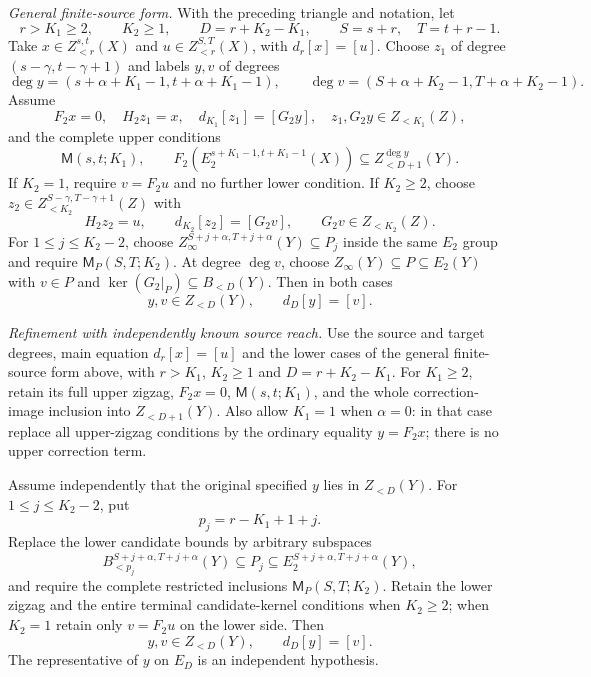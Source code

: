 \begin{corollary}
\textit{General finite-source form.}
With the preceding triangle and notation, let
\[
r>K_1\ge2,\qquad K_2\ge1,\qquad D=r+K_2-K_1,
\qquad S=s+r,\quad T=t+r-1.
\]
Take $x\in Z_{<r}^{s,t}(X)$ and $u\in Z_{<r}^{S,T}(X)$,
with $d_r[x]=[u]$. Choose $z_1$ of degree
$(s-\gamma,t-\gamma+1)$ and labels $y,v$ of degrees
\[
\deg y=(s+\alpha+K_1-1,t+\alpha+K_1-1),\qquad
\deg v=(S+\alpha+K_2-1,T+\alpha+K_2-1).
\]
Assume
\[
F_2x=0,\quad H_2z_1=x,\quad d_{K_1}[z_1]=[G_2y],
\quad z_1,G_2y\in Z_{<K_1}(Z),
\]
and the complete upper conditions
\[
\mathsf M(s,t;K_1),\qquad
F_2\!\left(E_2^{s+K_1-1,t+K_1-1}(X)\right)
 \subseteq Z_{<D+1}^{\deg y}(Y).
\]
If $K_2=1$, require $v=F_2u$ and no further lower condition.
If $K_2\ge2$, choose $z_2\in Z_{<K_2}^{S-\gamma,T-\gamma+1}(Z)$
with
\[
H_2z_2=u,\qquad d_{K_2}[z_2]=[G_2v],\qquad G_2v\in Z_{<K_2}(Z).
\]
For $1\le j\le K_2-2$, choose
$Z_\infty^{S+j+\alpha,T+j+\alpha}(Y)\subseteq P_j$
inside the same $E_2$ group and require $\mathsf M_P(S,T;K_2)$.
At degree $\deg v$, choose $Z_\infty(Y)\subseteq P\subseteq E_2(Y)$
with $v\in P$ and $\ker(G_2|_P)\subseteq B_{<D}(Y)$.
Then in both cases
\[
y,v\in Z_{<D}(Y),\qquad d_D[y]=[v].
\]

\textit{Refinement with independently known source reach.}
Use the source and target degrees, main equation $d_r[x]=[u]$ and
the lower cases of
the general finite-source form above, with
$r>K_1$, $K_2\ge1$ and $D=r+K_2-K_1$.
For $K_1\ge2$, retain its full upper zigzag, $F_2x=0$,
$\mathsf M(s,t;K_1)$, and the whole correction-image inclusion into
$Z_{<D+1}(Y)$. Also allow $K_1=1$ when $\alpha=0$: in that case
replace all upper-zigzag conditions by the ordinary equality $y=F_2x$;
there is no upper correction term.

Assume independently that the original specified $y$ lies in
$Z_{<D}(Y)$. For $1\le j\le K_2-2$, put
\[
p_j=r-K_1+1+j.
\]
Replace the lower candidate bounds by arbitrary subspaces
\[
B_{<p_j}^{S+j+\alpha,T+j+\alpha}(Y)
 \subseteq P_j\subseteq E_2^{S+j+\alpha,T+j+\alpha}(Y),
\]
and require the complete restricted inclusions
$\mathsf M_P(S,T;K_2)$. Retain the lower zigzag and the entire
terminal candidate-kernel conditions when $K_2\ge2$; when $K_2=1$
retain only $v=F_2u$ on the lower side. Then
\[
y,v\in Z_{<D}(Y),\qquad d_D[y]=[v].
\]
The representative of $y$ on $E_D$ is an independent hypothesis.
\end{corollary}
